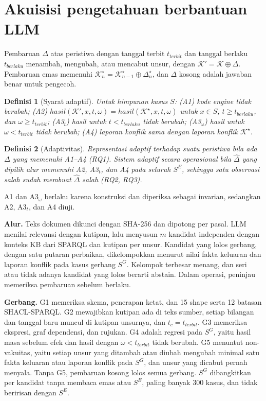 \documentclass[conference]{IEEEtran}
\makeatletter
\DeclareRobustCommand{\en}[1]{{\usefont{\f@encoding}{\f@family}{\f@series}{it}#1\/}}
\newtheorem{definisi}{Definisi}
\newcommand{\K}{\mathcal{K}}
\newcommand{\hasil}{\mathit{hasil}}
\newcommand{\emas}{\star}
\newcommand{\SG}{S^{G}}
\newcommand{\SE}{S^{E}}
\makeatother
\begin{document}
\section{Akuisisi pengetahuan berbantuan LLM}
\label{sec:akuisisi}
Pembaruan $\Delta$ atas peristiwa dengan tanggal terbit $t_{\mathit{terbit}}$ dan tanggal berlaku $t_{\mathit{berlaku}}$ menambah, mengubah, atau mencabut unsur, dengan $\K' = \K \oplus \Delta$. Pembaruan emas memenuhi $\K^{\emas}_n = \K^{\emas}_{n-1} \oplus \Delta^{\emas}_n$, dan $\Delta$ kosong adalah jawaban benar untuk pengecoh.

\begin{definisi}[Syarat adaptif]
\label{def:syarat}
Untuk himpunan kasus $S$: (A1) kode \en{engine} tidak berubah; (A2) $\hasil(\K', x, t, \omega) = \hasil(\K^{\emas}, x, t, \omega)$ untuk $x \in S$, $t \geq t_{\mathit{berlaku}}$, dan $\omega \geq t_{\mathit{terbit}}$; (A3$_t$) hasil untuk $t < t_{\mathit{berlaku}}$ tidak berubah; (A3$_\omega$) hasil untuk $\omega < t_{\mathit{terbit}}$ tidak berubah; (A4) laporan konflik sama dengan laporan konflik $\K^{\emas}$.
\end{definisi}

\begin{definisi}[Adaptivitas]
\label{def:adapt}
Representasi adaptif terhadap suatu peristiwa bila \emph{ada} $\Delta$ yang memenuhi A1--A4 (RQ1). Sistem adaptif secara operasional bila $\hat{\Delta}$ yang \emph{dipilih alur} memenuhi A2, A3$_t$, dan A4 pada seluruh $\SE$, sehingga satu observasi salah sudah membuat $\hat{\Delta}$ salah (RQ2, RQ3).
\end{definisi}

A1 dan A3$_\omega$ berlaku karena konstruksi dan diperiksa sebagai invarian, sedangkan A2, A3$_t$, dan A4 diuji.

\textbf{Alur.} Teks dokumen dikunci dengan SHA-256 dan dipotong per pasal. LLM menilai relevansi dengan kutipan, lalu menyusun $m$ kandidat independen dengan konteks KB dari SPARQL dan kutipan per unsur. Kandidat yang lolos gerbang, dengan satu putaran perbaikan, dikelompokkan menurut nilai fakta keluaran dan laporan konflik pada kasus gerbang $\SG$. Kelompok terbesar menang, dan seri atau tidak adanya kandidat yang lolos berarti \en{abstain}. Dalam operasi, peninjau memeriksa pembaruan sebelum berlaku.

\textbf{Gerbang.} G1 memeriksa skema, penerapan ketat, dan 15 \en{shape} serta 12 batasan SHACL-SPARQL. G2 mewajibkan kutipan ada di teks sumber, setiap bilangan dan tanggal baru muncul di kutipan unsurnya, dan $t_c = t_{\mathit{terbit}}$. G3 memeriksa ekspresi, graf dependensi, dan rujukan. G4 adalah regresi pada $\SG$, yaitu hasil masa sebelum efek dan hasil dengan $\omega < t_{\mathit{terbit}}$ tidak berubah. G5 menuntut non-vakuitas, yaitu setiap unsur yang ditambah atau diubah mengubah minimal satu fakta keluaran atau laporan konflik pada $\SG$, dan unsur yang dicabut pernah menyala. Tanpa G5, pembaruan kosong lolos semua gerbang. $\SG$ dibangkitkan per kandidat tanpa membaca emas atau $\SE$, paling banyak 300 kasus, dan tidak beririsan dengan $\SE$.
\end{document}

